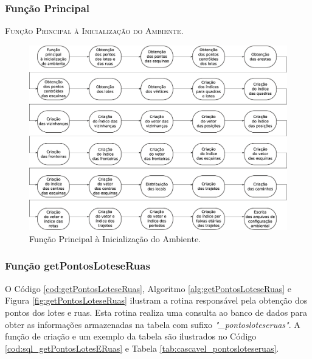 \subsubsection{Função Principal}



\begin{algorithm}[H]
   \SetAlgoLined   
   
   \caption{\textsc{Função Principal à Inicialização do Ambiente.}}
   \label{alg:mainAmb}
\end{algorithm}

\begin{figure}[H]
  \centering
  \includegraphics[width=1\textwidth]{Figuras/Simula/Fluxos/Main.eps}
  \caption{Função Principal à Inicialização do Ambiente.}
  \label{fig:mainAmb}
\end{figure} 

\newpage

\subsubsection{Função getPontosLoteseRuas}

O Código \ref{cod:getPontosLoteseRuas}, Algoritmo \ref{alg:getPontosLoteseRuas} e Figura \ref{fig:getPontosLoteseRuas} ilustram a rotina responsável pela obtenção dos pontos dos lotes e ruas. Esta rotina realiza uma consulta ao banco de dados para obter as informações armazenadas na tabela com sufixo \textit{"\_pontosloteseruas"}. A função de criação e um exemplo da tabela são ilustrados no Código \ref{cod:sql_getPontosLotesERuas} e Tabela \ref{tab:cascavel_pontosloteseruas}.

